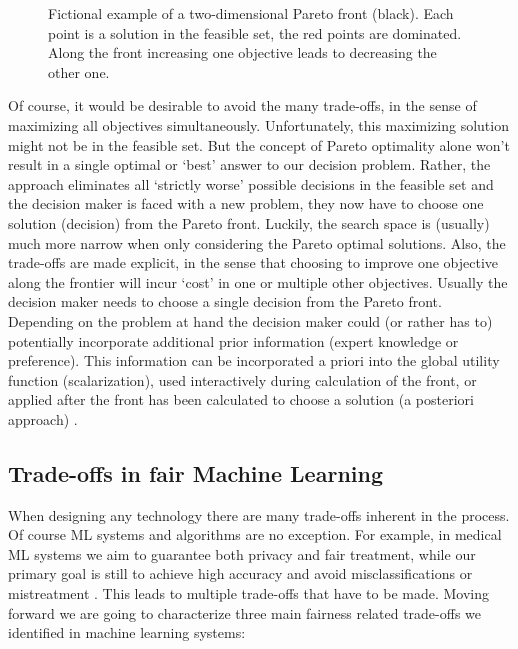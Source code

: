 	\begin{figure}
	\begin{center}
			
	\caption{Fictional example of a two-dimensional Pareto front (black). Each point is a solution in the feasible set, the red points are dominated. Along the front increasing one objective leads to decreasing the other one.}
	\label{fig:pareto}
	\end{center}
	\end{figure}
	
	Of course, it would be desirable to avoid the many trade-offs, in the sense of maximizing all objectives simultaneously.
	Unfortunately, this maximizing solution might not be in the feasible set.
	But the concept of Pareto optimality alone won't result in a single optimal or `best' answer to our decision problem.
	Rather, the approach eliminates all `strictly worse' possible decisions in the feasible set and the decision maker is faced with a new problem, they now have to choose one solution (decision) from the Pareto front.
	Luckily, the search space is (usually) much more narrow when only considering the Pareto optimal solutions.
	Also, the trade-offs are made explicit, in the sense that choosing to improve one objective along the frontier will incur `cost' in one or multiple other objectives.
	Usually the decision maker needs to choose a single decision from the Pareto front.
	Depending on the problem at hand the decision maker could (or rather has to) potentially incorporate additional prior information (expert knowledge or preference).
	This information can be incorporated a priori into the global utility function (scalarization), used interactively during calculation of the front, or applied after the front has been calculated to choose a solution (a posteriori approach) \cite{hwang2012multiple}.


	\subsection{Trade-offs in fair Machine Learning}
	When designing any technology \cite{alexander1964notes} there are many trade-offs inherent in the process.
	Of course ML systems and algorithms are no exception.
	For example, in medical ML systems we aim to guarantee both privacy and fair treatment, while our primary goal is still to achieve high accuracy and avoid misclassifications or mistreatment \cite{Chester2020}.
	This leads to multiple trade-offs that have to be made.
	Moving forward we are going to characterize three main fairness related trade-offs we identified in machine learning systems:
	
